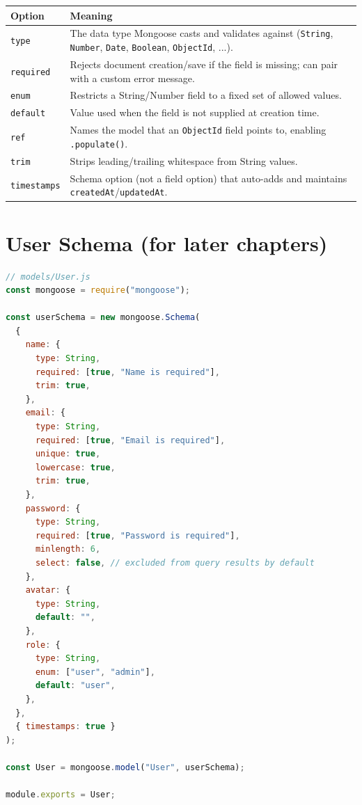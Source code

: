 \begin{table}[h]
\centering
\begin{tabularx}{\textwidth}{l X}
\toprule
\textbf{Option} & \textbf{Meaning} \\
\midrule
\texttt{type}     & The data type Mongoose casts and validates against (\texttt{String}, \texttt{Number}, \texttt{Date}, \texttt{Boolean}, \texttt{ObjectId}, ...). \\
\texttt{required}  & Rejects document creation/save if the field is missing; can pair with a custom error message. \\
\texttt{enum}      & Restricts a String/Number field to a fixed set of allowed values. \\
\texttt{default}   & Value used when the field is not supplied at creation time. \\
\texttt{ref}       & Names the model that an \texttt{ObjectId} field points to, enabling \texttt{.populate()}. \\
\texttt{trim}      & Strips leading/trailing whitespace from String values. \\
\texttt{timestamps} & Schema option (not a field option) that auto-adds and maintains \texttt{createdAt}/\texttt{updatedAt}. \\
\bottomrule
\end{tabularx}
\end{table}

\section{User Schema (for later chapters)}

\begin{lstlisting}[language=JavaScript]
// models/User.js
const mongoose = require("mongoose");

const userSchema = new mongoose.Schema(
  {
    name: {
      type: String,
      required: [true, "Name is required"],
      trim: true,
    },
    email: {
      type: String,
      required: [true, "Email is required"],
      unique: true,
      lowercase: true,
      trim: true,
    },
    password: {
      type: String,
      required: [true, "Password is required"],
      minlength: 6,
      select: false, // excluded from query results by default
    },
    avatar: {
      type: String,
      default: "",
    },
    role: {
      type: String,
      enum: ["user", "admin"],
      default: "user",
    },
  },
  { timestamps: true }
);

const User = mongoose.model("User", userSchema);

module.exports = User;
\end{lstlisting}

